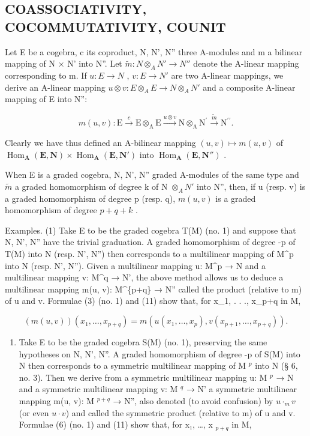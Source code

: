 \subsection{COASSOCIATIVITY, COCOMMUTATIVITY, COUNIT}

Let E be a cogebra, c its coproduct, N, N', N'' three A-modules and m a bilinear mapping of N × N' into N''. Let \(\tilde{m}:N \otimes_{A} N' \to N''\) denote the A-linear mapping corresponding to m. If \(u:E \to N\) , \(v:E \to N'\) are two A-linear mappings, we derive an A-linear mapping \(u \otimes v:E \otimes_{A} E \to N \otimes_{A} N'\) and a composite A-linear mapping of E into N'':

\[
m (u, v): \mathrm{E} \xrightarrow {c} \mathrm{E} \otimes_ {\mathrm{A}} \mathrm{E} \xrightarrow {u \otimes v} \mathrm{N} \otimes_ {\mathrm{A}} \mathrm{N} ^ {\prime} \xrightarrow {\tilde {m}} \mathrm{N} ^ {\prime \prime}.\tag{11}
\]

Clearly we have thus defined an A-bilinear mapping \((u, v) \mapsto m(u, v)\) of \(\operatorname{Hom}_{\mathbf{A}}(\mathbf{E}, \mathbf{N}) \times \operatorname{Hom}_{\mathbf{A}}(\mathbf{E}, \mathbf{N}')\) into \(\operatorname{Hom}_{\mathbf{A}}(\mathbf{E}, \mathbf{N}'')\) .

When E is a graded cogebra, N, N', N'' graded A-modules of the same type and \(\tilde{m}\) a graded homomorphism of degree k of N \(\otimes_{A}N'\) into N'', then, if u (resp. v) is a graded homomorphism of degree p (resp. q), \(m(u,v)\) is a graded homomorphism of degree \(p + q + k\) .

Examples. (1) Take E to be the graded cogebra T(M) (no. 1) and suppose that N, N', N'' have the trivial graduation. A graded homomorphism of degree -p of T(M) into N (resp. N', N'') then corresponds to a multilinear mapping of M\^{}p into N (resp. N', N''). Given a multilinear mapping u: M\^{}p → N and a multilinear mapping v: M\^{}q → N', the above method allows us to deduce a multilinear mapping m(u, v): M\^{}\{p+q\} → N'' called the product (relative to m) of u and v. Formulae (3) (no. 1) and (11) show that, for x\_1, . . ., x\_p+q in M,

\[
(m (u, v)) \left(x _ {1}, \dots , x _ {p + q}\right) = m \left(u \left(x _ {1}, \dots , x _ {p}\right), v \left(x _ {p + 1}, \dots , x _ {p + q}\right)\right).
\]

\begin{enumerate}
\def\labelenumi{(\arabic{enumi})}
\setcounter{enumi}{1}
\tightlist
\item
  Take E to be the graded cogebra S(M) (no. 1), preserving the same hypotheses on N, N', N''. A graded homomorphism of degree -p of S(M) into N then corresponds to a symmetric multilinear mapping of M \(^{p}\) into N (§ 6, no. 3). Then we derive from a symmetric multilinear mapping u: M \(^{p}\) → N and a symmetric multilinear mapping v: M \(^{q}\) → N' a symmetric multilinear mapping m(u, v): M \(^{p+q}\) → N'', also denoted (to avoid confusion) by \(u \cdot_{m} v\) (or even \(u \cdot v\)) and called the symmetric product (relative to m) of u and v. Formulae (6) (no. 1) and (11) show that, for x₁, \ldots, x \(_{p+q}\) in M,
\end{enumerate}

